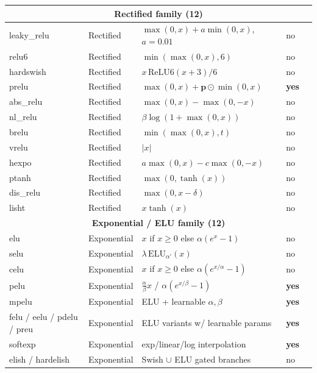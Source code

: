\begin{longtable}{p{2.6cm}p{1.4cm}p{5.2cm}p{0.9cm}p{2.0cm}}
\multicolumn{5}{c}{\textbf{Rectified family (12)}} \\
\midrule
leaky\_relu & Rectified & $\max(0,x)+a\min(0,x)$, $a{=}0.01$ & no & \citep{maas2013leakyrelu} \\
relu6 & Rectified & $\min(\max(0,x),6)$ & no & \citep{howard2019hardswish} \\
hardswish & Rectified & $x\,\text{ReLU6}(x{+}3)/6$ & no & \citep{howard2019hardswish} \\
prelu & Rectified & $\max(0,x)+\mathbf{p}\odot\min(0,x)$ & \textbf{yes} & \citep{he2015prelu} \\
abs\_relu & Rectified & $\max(0,x)-\max(0,-x)$ & no & \citep{dubey2021activations} \\
nl\_relu & Rectified & $\beta\log(1+\max(0,x))$ & no & \citep{dubey2021activations} \\
brelu & Rectified & $\min(\max(0,x),t)$ & no & \citep{dubey2021activations} \\
vrelu & Rectified & $|x|$ & no & \citep{dubey2021activations} \\
hexpo & Rectified & $a\max(0,x)-c\max(0,-x)$ & no & \citep{dubey2021activations} \\
ptanh & Rectified & $\max(0,\tanh(x))$ & no & \citep{dubey2021activations} \\
dis\_relu & Rectified & $\max(0,x-\delta)$ & no & \citep{dubey2021activations} \\
lisht & Rectified & $x\tanh(x)$ & no & \citep{roy2019lisht} \\
\midrule

\multicolumn{5}{c}{\textbf{Exponential / ELU family (12)}} \\
\midrule
elu & Exponential & $x$ if $x\ge0$ else $\alpha(e^x{-}1)$ & no & \citep{clevert2016elu} \\
selu & Exponential & $\lambda\,\text{ELU}_{\alpha'}(x)$ & no & \citep{klambauer2017selu} \\
celu & Exponential & $x$ if $x\ge0$ else $\alpha(e^{x/\alpha}{-}1)$ & no & \citep{barron2017celu} \\
pelu & Exponential & $\tfrac{\alpha}{\beta}x$ / $\alpha(e^{x/\beta}{-}1)$ & \textbf{yes} & \citep{dubey2021activations} \\
mpelu & Exponential & ELU + learnable $\alpha,\beta$ & \textbf{yes} & \citep{dubey2021activations} \\
felu / eelu / pdelu / preu & Exponential & ELU variants w/ learnable params & \textbf{yes} & \citep{dubey2021activations} \\
softexp & Exponential & exp/linear/log interpolation & \textbf{yes} & \citep{dubey2021activations} \\
elish / hardelish & Exponential & Swish $\cup$ ELU gated branches & no & \citep{basirat2019elish} \\
\midrule


\end{longtable}
